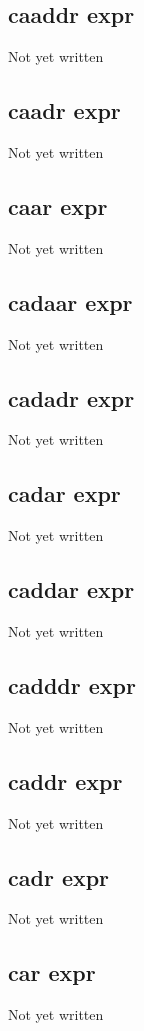 \documentclass[a4paper,11pt]{article}
\begin{document}
\subsection{\ttfamily caaddr expr}
Not yet written

\subsection{\ttfamily caadr expr}
Not yet written

\subsection{\ttfamily caar expr}
Not yet written

\subsection{\ttfamily cadaar expr}
Not yet written

\subsection{\ttfamily cadadr expr}
Not yet written

\subsection{\ttfamily cadar expr}
Not yet written

\subsection{\ttfamily caddar expr}
Not yet written

\subsection{\ttfamily cadddr expr}
Not yet written

\subsection{\ttfamily caddr expr}
Not yet written

\subsection{\ttfamily cadr expr}
Not yet written

\subsection{\ttfamily car expr}
Not yet written
\end{document}
